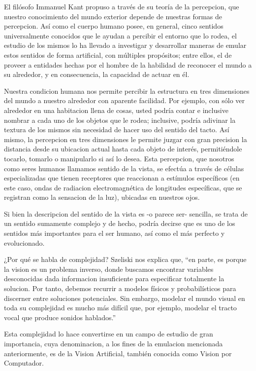 El filósofo Immanuel Kant propuso a través de su teoría de la percepcion, que nuestro conocimiento del mundo exterior depende de nuestras formas de percepcion. Así como el cuerpo humano posee, en general, cinco sentidos universalmente conocidos que le ayudan a percibir el entorno que lo rodea, el estudio de los mismos lo ha llevado a investigar y desarrollar maneras de emular estos sentidos de forma artificial, con múltiples propósitos; entre ellos, el de proveer a entidades hechas por el hombre de la habilidad de reconocer el mundo a su alrededor, y en consecuencia, la capacidad de actuar en él.

Nuestra condicion humana nos permite percibir la estructura en tres dimensiones del mundo a nuestro alrededor con aparente facilidad. Por ejemplo, con sólo ver alrededor en una habitacion llena de cosas, usted podría contar e inclusive nombrar a cada uno de los objetos que le rodea; inclusive, podría adivinar la textura de los mismos sin necesidad de hacer uso del sentido del tacto. Así mismo, la percepcion en tres dimensiones le permite juzgar con gran precision la distancia desde su ubicacion actual hasta cada objeto de interés, permitiéndole tocarlo, tomarlo o manipularlo si así lo desea. Esta percepcion, que nosotros como seres humanos llamamos sentido de la vista, se efectúa a través de células especializadas que tienen receptores que reaccionan a estímulos específicos (en este caso, ondas de radiacion electromagnética de longitudes específicas, que se registran como la sensacion de la luz), ubicadas en nuestros ojos.

Si bien la descripcion del sentido de la vista es -o parece ser- sencilla, se trata de un sentido sumamente complejo y de hecho, podría decirse que es uno de los sentidos más importantes para el ser humano, así como el más perfecto y evolucionado.

¿Por qué se habla de complejidad? Szeliski nos explica que, ``en parte, es porque la vision es un problema inverso, donde buscamos encontrar variables desconocidas dada informacion insuficiente para especificar totalmente la solucion. Por tanto, debemos recurrir a modelos físicos y probabilísticos para discerner entre soluciones potenciales. Sin embargo, modelar el mundo visual en toda su complejidad es mucho más difícil que, por ejemplo, modelar el tracto vocal que produce sonidos hablados.''\citep{RS:09}

Esta complejidad lo hace convertirse en un campo de estudio de gran importancia, cuya denominacion, a los fines de la
emulacion mencionada anteriormente, es de la Vision Artificial, también conocida como Vision por Computador.

